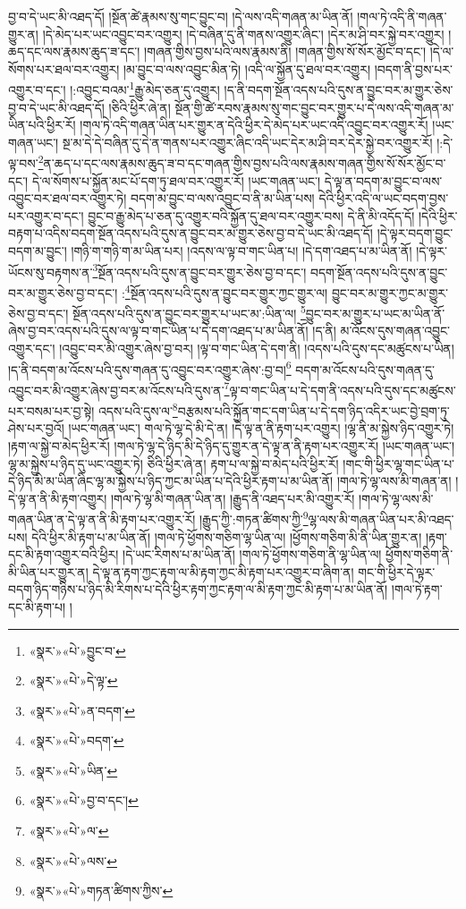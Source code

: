 བྱ་བ་དེ་ཡང་མི་འཐད་དོ། །སྔོན་ཚེ་རྣམས་སུ་གང་བྱུང་བ། །དེ་ལས་འདི་གཞན་མ་ཡིན་ནོ། །གལ་ཏེ་འདི་ནི་གཞན་གྱུར་ན། །དེ་མེད་པར་ཡང་འབྱུང་བར་འགྱུར། །དེ་བཞིན་དུ་ནི་གནས་འགྱུར་ཞིང་། །དེར་མ་ཤི་བར་སྐྱེ་བར་འགྱུར། །ཆད་དང་ལས་རྣམས་ཆུད་ཟ་དང་། །གཞན་གྱིས་བྱས་པའི་ལས་རྣམས་ནི། །གཞན་གྱིས་སོ་སོར་མྱོང་བ་དང་། །དེ་ལ་སོགས་པར་ཐལ་བར་འགྱུར། །མ་བྱུང་བ་ལས་འབྱུང་མིན་ཏེ། །འདི་ལ་སྐྱོན་དུ་ཐལ་བར་འགྱུར། །བདག་ནི་བྱས་པར་འགྱུར་བ་དང་། །:འབྱུང་བའམ་\footnote{«སྣར་»«པེ་»བྱུང་བ་}རྒྱུ་མེད་ཅན་དུ་འགྱུར། །ད་ནི་བདག་སྔོན་འདས་པའི་དུས་ན་བྱུང་བར་མ་གྱུར་ཅེས་བྱ་བ་དེ་ཡང་མི་འཐད་དོ། །ཅིའི་ཕྱིར་ཞེ་ན། སྔོན་གྱི་ཚེ་རབས་རྣམས་སུ་གང་བྱུང་བར་གྱུར་པ་དེ་ལས་འདི་གཞན་མ་ཡིན་པའི་ཕྱིར་རོ། །གལ་ཏེ་འདི་གཞན་ཡིན་པར་གྱུར་ན་དེའི་ཕྱིར་དེ་མེད་པར་ཡང་འདི་འབྱུང་བར་འགྱུར་རོ། །ཡང་གཞན་ཡང་། སྔ་མ་དེ་དེ་བཞིན་དུ་དེ་ན་གནས་པར་འགྱུར་ཞིང་འདི་ཡང་དེར་མ་ཤི་བར་དེར་སྐྱེ་བར་འགྱུར་རོ། །:དེ་ལྟ་བས་\footnote{«སྣར་»«པེ་»དེ་ལྟ་}ན་ཆད་པ་དང་ལས་རྣམས་ཆུད་ཟ་བ་དང་གཞན་གྱིས་བྱས་པའི་ལས་རྣམས་གཞན་གྱིས་སོ་སོར་མྱོང་བ་དང་། དེ་ལ་སོགས་པ་སྐྱོན་མང་པོ་དག་ཏུ་ཐལ་བར་འགྱུར་རོ། །ཡང་གཞན་ཡང་། དེ་ལྟ་ན་བདག་མ་བྱུང་བ་ལས་འབྱུང་བར་ཐལ་བར་འགྱུར་ཏེ། བདག་མ་བྱུང་བ་ལས་འབྱུང་བ་ནི་མ་ཡིན་པས། དེའི་ཕྱིར་འདི་ལ་ཡང་བདག་བྱས་པར་འགྱུར་བ་དང་། བྱུང་བ་རྒྱུ་མེད་པ་ཅན་དུ་འགྱུར་བའི་སྐྱོན་དུ་ཐལ་བར་འགྱུར་བས། དེ་ནི་མི་འདོད་དོ། །དེའི་ཕྱིར་བརྟག་པ་འདིས་བདག་སྔོན་འདས་པའི་དུས་ན་བྱུང་བར་མ་གྱུར་ཅེས་བྱ་བ་དེ་ཡང་མི་འཐད་དོ། །དེ་ལྟར་བདག་བྱུང་བདག་མ་བྱུང་། །གཉི་ག་གཉི་ག་མ་ཡིན་པར། །འདས་ལ་ལྟ་བ་གང་ཡིན་པ། །དེ་དག་འཐད་པ་མ་ཡིན་ནོ། །དེ་ལྟར་ཡོངས་སུ་བརྟགས་ན་\footnote{«སྣར་»«པེ་»ན་བདག་}སྔོན་འདས་པའི་དུས་ན་བྱུང་བར་གྱུར་ཅེས་བྱ་བ་དང་། བདག་སྔོན་འདས་པའི་དུས་ན་བྱུང་བར་མ་གྱུར་ཅེས་བྱ་བ་དང་། :\footnote{«སྣར་»«པེ་»བདག་}སྔོན་འདས་པའི་དུས་ན་བྱུང་བར་གྱུར་ཀྱང་གྱུར་ལ། བྱུང་བར་མ་གྱུར་ཀྱང་མ་གྱུར་ཅེས་བྱ་བ་དང་། སྔོན་འདས་པའི་དུས་ན་བྱུང་བར་གྱུར་པ་ཡང་མ་:ཡིན་ལ། \footnote{«སྣར་»«པེ་»ཡིན་}བྱུང་བར་མ་གྱུར་པ་ཡང་མ་ཡིན་ནོ་ཞེས་བྱ་བར་འདས་པའི་དུས་ལ་ལྟ་བ་གང་ཡིན་པ་དེ་དག་འཐད་པ་མ་ཡིན་ནོ། །ད་ནི། མ་འོངས་དུས་གཞན་འབྱུང་འགྱུར་དང་། །འབྱུང་བར་མི་འགྱུར་ཞེས་བྱ་བར། །ལྟ་བ་གང་ཡིན་དེ་དག་ནི། །འདས་པའི་དུས་དང་མཚུངས་པ་ཡིན། །ད་ནི་བདག་མ་འོངས་པའི་དུས་གཞན་དུ་འབྱུང་བར་འགྱུར་ཞེས་:བྱ་བ།\footnote{«སྣར་»«པེ་»བྱ་བ་དང་།} བདག་མ་འོངས་པའི་དུས་གཞན་དུ་འབྱུང་བར་མི་འགྱུར་ཞེས་བྱ་བར་མ་འོངས་པའི་དུས་ན་\footnote{«སྣར་»«པེ་»ལ་}ལྟ་བ་གང་ཡིན་པ་དེ་དག་ནི་འདས་པའི་དུས་དང་མཚུངས་པར་བསམ་པར་བྱ་སྟེ། འདས་པའི་དུས་ལ་\footnote{«སྣར་»«པེ་»ལས་}བརྩམས་པའི་སྐྱོན་གང་དག་ཡིན་པ་དེ་དག་ཉིད་འདིར་ཡང་བྱེ་བྲག་ཏུ་ཤེས་པར་བྱའོ། །ཡང་གཞན་ཡང་། གལ་ཏེ་ལྷ་དེ་མི་དེ་ན། །དེ་ལྟ་ན་ནི་རྟག་པར་འགྱུར། །ལྷ་ནི་མ་སྐྱེས་ཉིད་འགྱུར་ཏེ། །རྟག་ལ་སྐྱེ་བ་མེད་ཕྱིར་རོ། །གལ་ཏེ་ལྷ་དེ་ཉིད་མི་དེ་ཉིད་དུ་གྱུར་ན་དེ་ལྟ་ན་ནི་རྟག་པར་འགྱུར་རོ། །ཡང་གཞན་ཡང་། ལྷ་མ་སྐྱེས་པ་ཉིད་དུ་ཡང་འགྱུར་ཏེ། ཅིའི་ཕྱིར་ཞེ་ན། རྟག་པ་ལ་སྐྱེ་བ་མེད་པའི་ཕྱིར་རོ། །གང་གི་ཕྱིར་ལྷ་གང་ཡིན་པ་དེ་ཉིད་མི་མ་ཡིན་ཞིང་ལྷ་མ་སྐྱེས་པ་ཉིད་ཀྱང་མ་ཡིན་པ་དེའི་ཕྱིར་རྟག་པ་མ་ཡིན་ནོ། །གལ་ཏེ་ལྷ་ལས་མི་གཞན་ན། །དེ་ལྟ་ན་ནི་མི་རྟག་འགྱུར། །གལ་ཏེ་ལྷ་མི་གཞན་ཡིན་ན། །རྒྱུད་ནི་འཐད་པར་མི་འགྱུར་རོ། །གལ་ཏེ་ལྷ་ལས་མི་གཞན་ཡིན་ན་དེ་ལྟ་ན་ནི་མི་རྟག་པར་འགྱུར་རོ། །རྒྱུད་ཀྱི་:གཏན་ཚིགས་ཀྱི་\footnote{«སྣར་»«པེ་»གཏན་ཚིགས་ཀྱིས་}ལྷ་ལས་མི་གཞན་ཡིན་པར་མི་འཐད་པས། དེའི་ཕྱིར་མི་རྟག་པ་མ་ཡིན་ནོ། །གལ་ཏེ་ཕྱོགས་གཅིག་ལྷ་ཡིན་ལ། །ཕྱོགས་གཅིག་མི་ནི་ཡིན་གྱུར་ན། །རྟག་དང་མི་རྟག་འགྱུར་བའི་ཕྱིར། །དེ་ཡང་རིགས་པ་མ་ཡིན་ནོ། །གལ་ཏེ་ཕྱོགས་གཅིག་ནི་ལྷ་ཡིན་ལ། ཕྱོགས་གཅིག་ནི་མི་ཡིན་པར་གྱུར་ན། དེ་ལྟ་ན་རྟག་ཀྱང་རྟག་ལ་མི་རྟག་ཀྱང་མི་རྟག་པར་འགྱུར་བ་ཞིག་ན། གང་གི་ཕྱིར་དེ་ལྟར་བདག་ཉིད་གཉིས་པ་ཉིད་མི་རིགས་པ་དེའི་ཕྱིར་རྟག་ཀྱང་རྟག་ལ་མི་རྟག་ཀྱང་མི་རྟག་པ་མ་ཡིན་ནོ། །གལ་ཏེ་རྟག་དང་མི་རྟག་པ། །

